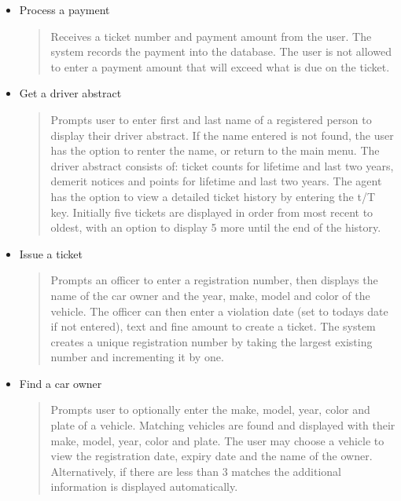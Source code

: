 \documentclass[10pt, a4paper]{article}
\begin{document}
{\begin{itemize}
\item Process a payment
	\begin{quotation}
	\noindent Receives a ticket number and payment amount from the user. The system records the payment into the database. The user is not allowed to enter a payment amount that will exceed what is due on the ticket.
	\end{quotation}

\item Get a driver abstract
	\begin{quotation}
	\noindent Prompts user to enter first and last name of a registered person to display their driver abstract. If the name entered is not found, the user has the option to renter the name, or return to the main menu. The driver abstract consists of: ticket counts for lifetime and last two years, demerit notices and points for lifetime and last two years. The agent has the option to view a detailed ticket history by entering the t/T key. Initially five tickets are displayed in order from most recent to oldest, with an option to display 5 more until the end of the history.
	\end{quotation}

\item Issue a ticket
	\begin{quotation}
	\noindent Prompts an officer to enter a registration number, then displays the name of the car owner and the year, make, model and color of the vehicle. The officer can then enter a violation date (set to todays date if not entered), text and fine amount to create a ticket. The system creates a unique registration number by taking the largest existing number and incrementing it by one.
	\end{quotation}

\item Find a car owner
	\begin{quotation}
	\noindent Prompts user to optionally enter the make, model, year, color and plate of a vehicle. Matching vehicles are found and displayed with their make, model, year, color and plate. The user may choose a vehicle to view the registration date, expiry date and the name of the owner. Alternatively, if there are less than 3 matches the additional information is displayed automatically.
	\end{quotation}

\end{itemize}

}
\end{document}

